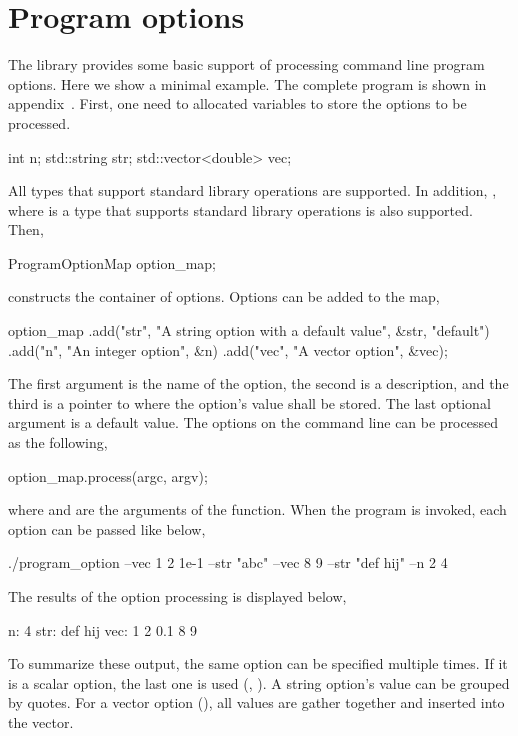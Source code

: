 \section{Program options}
\label{sec:Program options}

The library provides some basic support of processing command line program
options. Here we show a minimal example. The complete program is shown in
appendix~. First, one need to
allocated variables to store the options to be processed.
\begin{cppcode}
  int n;
  std::string str;
  std::vector<double> vec;
\end{cppcode}
All types that support standard library \io operations are supported. In
addition, , where  is a type that
supports standard library \io operations is also supported. Then,
\begin{cppcode}
  ProgramOptionMap option_map;
\end{cppcode}
constructs the container of options. Options can be added to the map,
\begin{cppcode}
  option_map
      .add("str", "A string option with a default value", &str, "default")
      .add("n", "An integer option", &n)
      .add("vec", "A vector option", &vec);
\end{cppcode}
The first argument is the name of the option, the second is a description, and
the third is a pointer to where the option's value shall be stored. The last
optional argument is a default value. The options on the command line can be
processed as the following,
\begin{cppcode}
  option_map.process(argc, argv);
\end{cppcode}
where  and  are the arguments of the
 function. When the program is invoked, each option can be
passed like below,
\begin{textcode}
  ./program_option --vec 1 2 1e-1 --str "abc" --vec 8 9 --str "def hij" --n 2 4
\end{textcode}
The results of the option processing is displayed below,
\begin{textcode}
  n: 4
  str: def hij
  vec: 1 2 0.1 8 9
\end{textcode}
To summarize these output, the same option can be specified multiple times. If
it is a scalar option, the last one is used (,
). A string option's value can be grouped by quotes. For a
vector option (), all values are gather together and inserted
into the vector.

